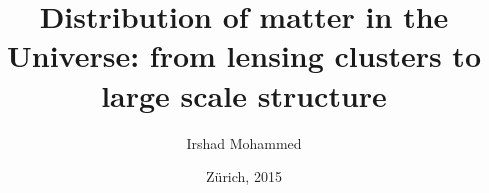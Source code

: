 


\title{Distribution of matter in the Universe: from lensing clusters
to  large scale structure}

\author{Irshad Mohammed}






\date{Z\"urich, 2015}

